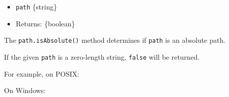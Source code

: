 \begin{itemize}
\tightlist
\item
  \texttt{path} \{string\}
\item
  Returns: \{boolean\}
\end{itemize}

The \texttt{path.isAbsolute()} method determines if \texttt{path} is an
absolute path.

If the given \texttt{path} is a zero-length string, \texttt{false} will
be returned.

For example, on POSIX:

\begin{Shaded}
\begin{Highlighting}[]
\NormalTok{(}\NormalTok{)}\OperatorTok{;} 
\NormalTok{(}\NormalTok{)}\OperatorTok{;}  
\NormalTok{(}\NormalTok{)}\OperatorTok{;}     
\NormalTok{(}\NormalTok{)}\OperatorTok{;}        
\end{Highlighting}
\end{Shaded}

On Windows:


